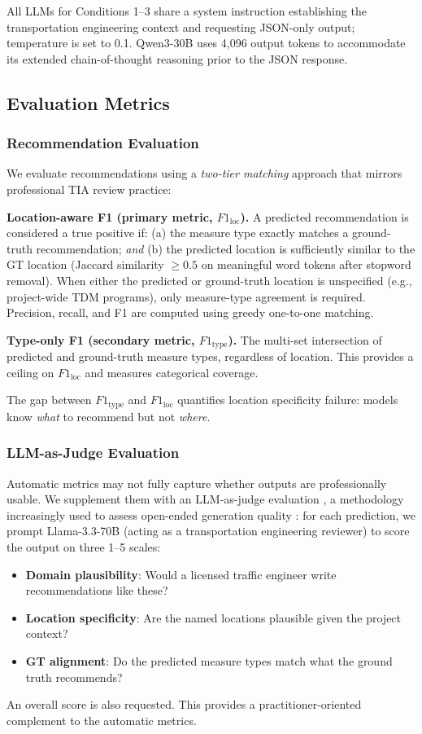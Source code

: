 \documentclass[preprint,12pt]{elsarticle}
\begin{document}
All LLMs for Conditions 1--3 share a system instruction establishing the
transportation engineering context and requesting JSON-only output;
temperature is set to 0.1. Qwen3-30B uses 4,096 output tokens to
accommodate its extended chain-of-thought reasoning prior to the JSON response.

\subsection{Evaluation Metrics}

\subsubsection{Recommendation Evaluation}

We evaluate recommendations using a \emph{two-tier matching} approach
that mirrors professional TIA review practice:

\textbf{Location-aware F1 (primary metric, $F1_\text{loc}$).}
A predicted recommendation is considered a true positive if:
(a) the measure type exactly matches a ground-truth recommendation; \emph{and}
(b) the predicted location is sufficiently similar to the GT location
(Jaccard similarity $\geq 0.5$ on meaningful word tokens after stopword removal).
When either the predicted or ground-truth location is unspecified (e.g.,
project-wide TDM programs), only measure-type agreement is required.
Precision, recall, and F1 are computed using greedy one-to-one matching.

\textbf{Type-only F1 (secondary metric, $F1_\text{type}$).}
The multi-set intersection of predicted and ground-truth measure types,
regardless of location. This provides a ceiling on $F1_\text{loc}$ and
measures categorical coverage.

The gap between $F1_\text{type}$ and $F1_\text{loc}$ quantifies location
specificity failure: models know \emph{what} to recommend but not
\emph{where}.

\subsubsection{LLM-as-Judge Evaluation}

Automatic metrics may not fully capture whether outputs are professionally
usable. We supplement them with an LLM-as-judge evaluation
\citep{LLMJudge2023}, a methodology increasingly used to assess open-ended
generation quality \citep{liang2022helm, chang2024survey}: for each
prediction, we prompt
Llama-3.3-70B (acting as a transportation engineering reviewer) to score
the output on three 1--5 scales:
\begin{itemize}
\item \textbf{Domain plausibility}: Would a licensed traffic engineer write
recommendations like these?
\item \textbf{Location specificity}: Are the named locations plausible given
the project context?
\item \textbf{GT alignment}: Do the predicted measure types match what the
ground truth recommends?
\end{itemize}
An overall score is also requested. This provides a practitioner-oriented
complement to the automatic metrics.
\end{document}
